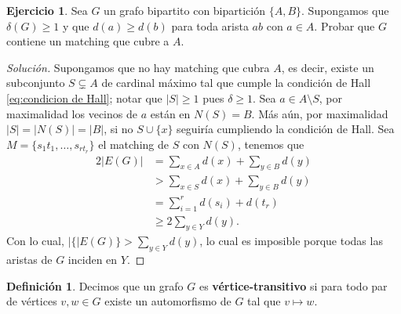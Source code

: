 \documentclass[12pt]{report}
\theoremstyle{plain}
\theoremstyle{definition}
\newtheorem{definition}[theorem]{Definición}
\newtheorem{exercise}[theorem]{Ejercicio}
\newenvironment{solution}{\begin{proof}[Solución]}{\end{proof}}
\newcommand{\abs}[1]{\left \vert #1 \right \vert}
\begin{document}
\begin{exercise}
Sea $G$ un grafo bipartito con bipartición $\{A,B\}$. Supongamos que $\delta (G) \geq 1$ y que $d(a) \geq d(b)$ para toda arista $ab$ con $a \in A$. Probar que $G$ contiene un matching que cubre a $A$.
\end{exercise}
\begin{solution}
Supongamos que no hay matching que cubra $A$, es decir, existe un subconjunto $S \subsetneq A$ de cardinal máximo tal que cumple la condición de Hall \ref{eq:condicion de Hall}; notar que $\abs S \geq 1$ pues $\delta \geq 1$. Sea $a \in A \setminus S$, por maximalidad los vecinos de $a$ están en $N(S) = B$. Más aún, por maximalidad $\abs S = \abs {N(S)} = \abs B$, si no $S \cup \{x\}$ seguiría cumpliendo la condición de Hall. Sea $M = \{s_1 t_1,\ldots, s_{r t_r} \}$ el matching de $S$ con $N(S)$, tenemos que
\begin{align*}
    2 \abs {E(G)} &= \sum_{x \in A} d(x) + \sum_{y \in B} d(y)\\
                &> \sum_{x \in S} d(x) + \sum_{y \in B} d(y) \\
                &= \sum_{i = 1}^r d(s_i) + d(t_r)\\
                &\geq 2 \sum_{y \in Y} d(y).
\end{align*}
Con lo cual, $\abs \{E(G)\} > \sum_{y \in Y} d(y)$, lo cual es imposible porque todas las aristas de $G$ inciden en $Y$.
\end{solution}

\begin{definition}
Decimos que un grafo $G$ es \textbf{vértice-transitivo} si para todo par de vértices $v,w\in G$ existe un automorfismo de $G$ tal que $v \mapsto w$.
\end{definition}
\end{document}
